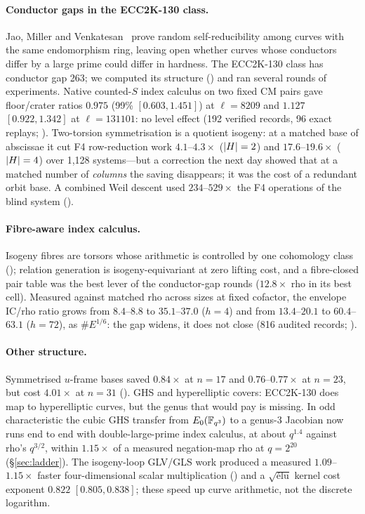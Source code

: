 \paragraph{Conductor gaps in the ECC2K-130 class.} Jao, Miller and
Venkatesan~\cite{jmv2005} prove random self-reducibility among curves with
the same endomorphism ring, leaving open whether curves whose conductors
differ by a large prime could differ in hardness. The ECC2K-130 class has
conductor gap 263; we computed its structure
() and ran
several rounds of experiments. Native counted-$S$ index calculus on two fixed CM
pairs gave floor/crater ratios $0.975$ (99\% $[0.603,1.451]$) at
$\ell=8209$ and $1.127$ $[0.922,1.342]$ at $\ell=131101$: no level effect
(192 verified records, 96 exact replays;
). Two-torsion
symmetrisation is a quotient isogeny: at a matched base of abscissae it
cut F4 row-reduction work $4.1$--$4.3\times$ ($\lvert H \rvert=2$) and
$17.6$--$19.6\times$ ($\lvert H \rvert=4$) over 1{,}128 systems---but a correction
the next day showed that at a matched number of \emph{columns} the saving
disappears; it was the cost of a redundant orbit base. A combined Weil
descent used $234$--$529\times$ the F4 operations of the blind system
().

\paragraph{Fibre-aware index calculus.} Isogeny fibres are torsors whose
arithmetic is controlled by one cohomology class
(); relation generation is
isogeny-equivariant at zero lifting cost, and a fibre-closed pair table was
the best lever of the conductor-gap rounds ($12.8\times$ rho in its best
cell). Measured against matched rho across sizes at fixed cofactor, the
envelope IC/rho ratio grows from $8.4$--$8.8$ to $35.1$--$37.0$ ($h=4$) and
from $13.4$--$20.1$ to $60.4$--$63.1$ ($h=72$), as $\#E^{1/6}$: the gap
widens, it does not close (816 audited records;
).

\paragraph{Other structure.} Symmetrised $u$-frame bases saved
$0.84\times$ at $n=17$ and $0.76$--$0.77\times$ at $n=23$, but cost
$4.01\times$ at $n=31$ ().
GHS and hyperelliptic covers: ECC2K-130 does map to hyperelliptic curves,
but the genus that would pay is missing. In odd characteristic the cubic
GHS transfer from $E_0(\mathbb{F}_{q^3})$ to a genus-3 Jacobian now runs end to end
with double-large-prime index calculus, at about $q^{1.4}$ against rho's
$q^{3/2}$, within $1.15\times$ of a measured negation-map rho at
$q=2^{20}$ (\S\ref{sec:ladder}). The
isogeny-loop GLV/GLS work produced a measured $1.09$--$1.15\times$ faster
four-dimensional scalar multiplication ()
and a $\sqrt{\text{\'elu}}$ kernel cost exponent $0.822$ $[0.805,0.838]$;
these speed up curve arithmetic, not the discrete logarithm.

